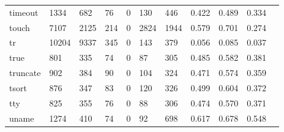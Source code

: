 \begin{longtable}{lp{1.10cm}p{1.10cm}p{1.10cm}p{1.10cm}p{1.10cm}p{1.10cm}p{1.10cm}p{1.10cm}p{1.10cm}p{1.10cm}}
timeout   &                   1334 &                                682 &                                76 &                                0 &                               130 &                             446 &                             0.422 &                                 0.489 &                               0.334 \\
touch     &                   7107 &                               2125 &                               214 &                                0 &                              2824 &                            1944 &                             0.579 &                                 0.701 &                               0.274 \\
tr        &                  10204 &                               9337 &                               345 &                                0 &                               143 &                             379 &                             0.056 &                                 0.085 &                               0.037 \\
true      &                    801 &                                335 &                                74 &                                0 &                                87 &                             305 &                             0.485 &                                 0.582 &                               0.381 \\
truncate  &                    902 &                                384 &                                90 &                                0 &                               104 &                             324 &                             0.471 &                                 0.574 &                               0.359 \\
tsort     &                    876 &                                347 &                                83 &                                0 &                               120 &                             326 &                             0.499 &                                 0.604 &                               0.372 \\
tty       &                    825 &                                355 &                                76 &                                0 &                                88 &                             306 &                             0.474 &                                 0.570 &                               0.371 \\
uname     &                   1274 &                                410 &                                74 &                                0 &                                92 &                             698 &                             0.617 &                                 0.678 &                               0.548 \\

\end{longtable}
